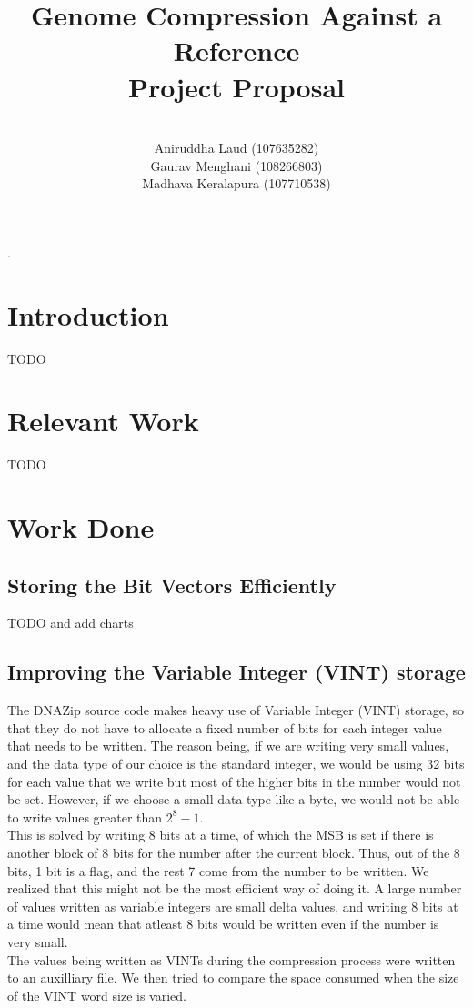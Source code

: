 \documentclass{article}
\title{Genome Compression Against a Reference \\
        Project Proposal \\}
\author{\\
        Aniruddha Laud (107635282)\\
        Gaurav Menghani (108266803)\\
        Madhava Keralapura (107710538)\\}
\begin{document}
\maketitle

\clearpage
.
\clearpage

\tableofcontents

\clearpage

\section {Introduction}
TODO
\clearpage

\section {Relevant Work}
TODO
\clearpage

\section {Work Done}

\subsection {Storing the Bit Vectors Efficiently}
TODO and add charts

\clearpage

\subsection {Improving the Variable Integer (VINT) storage}
The DNAZip source code makes heavy use of Variable Integer (VINT) storage, so that they do not have to allocate a fixed
number of bits for each integer value that needs to be written. The reason being, if we are writing very small values, and the data type of our choice is the standard integer, we would be using 32 bits for each value that we write but most of the higher bits in the number would not be set. However, if we choose a small data type like a byte, we would not be able to write values greater than $2^8 - 1$. \\
This is solved by writing 8 bits at a time, of which the MSB is set if there is another block of 8 bits for the number after the current block. Thus, out of the 8 bits, 1 bit is a flag, and the rest 7 come from the number to be written. We realized that this might not be the most efficient way of doing it. A large number of values written as variable integers are small delta values, and writing 8 bits at a time would mean that atleast 8 bits would be written even if the number is very small. \\
The values being written as VINTs during the compression process were written to an auxilliary file. We then tried to compare the space consumed when the size of the VINT word size is varied. 
\end{document}
